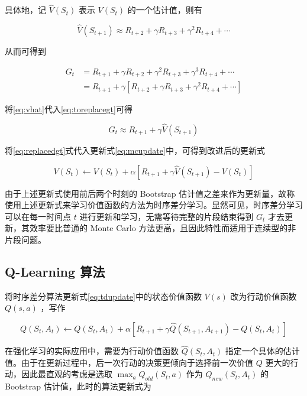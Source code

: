 具体地，记 $\widehat{V}(S_{t})$ 表示 $V({S_t})$ 的一个估计值，则有

\begin{equation}\label{eq:vhat}
    \widehat{V}(S_{t+1}) \approx R_{t+2} + \gamma R_{t+3} + \gamma^2 R_{t+4} + \cdots
\end{equation}

从而可得到

\begin{equation}\label{eq:toreplacegt}
    \begin{aligned}
        G_t &= R_{t+1}+\gamma R_{t+2}+\gamma^2 R_{t+3}+\gamma^3 R_{t+4}+\cdots\\
        &=R_{t+1}+\gamma\left[R_{t+2}+\gamma R_{t+3}+\gamma^2 R_{t+4}+\cdots\right]
    \end{aligned}
\end{equation}

将\ref{eq:vhat}代入\ref{eq:toreplacegt}可得

\begin{equation}\label{eq:replacedgt}
    G_t \approx R_{t+1} +\gamma \widehat{V}(S_{t+1})
\end{equation}

将\ref{eq:replacedgt}式代入更新式\ref{eq:mcupdate}中，可得到改进后的更新式

\begin{equation}\label{eq:tdupdate}
    V(S_t)\leftarrow V(S_t)+\alpha\left[R_{t+1}+\gamma \widehat{V}(S_{t+1})-V(S_t)\right]
\end{equation}

由于上述更新式使用前后两个时刻的 Bootstrap 估计值之差来作为更新量，故称使用上述更新式来学习价值函数的方法为{\jiacu 时序差分学习}。显然可见，时序差分学习可以在每一时间点 $t$ 进行更新和学习，无需等待完整的片段结束得到 $G_t$ 才去更新，其效率要比普通的 Monte Carlo 方法更高，且因此特性而适用于连续型的非片段问题。

\subsection{Q-Learning 算法}

将时序差分算法更新式\ref{eq:tdupdate}中的状态价值函数 $V(s)$ 改为行动价值函数 $Q(s,a)$ ，写作

\begin{equation}
    Q(S_t,A_t)\leftarrow Q(S_t,A_t)+\alpha\left[R_{t+1}+\gamma \widehat{Q}(S_{t+1},A_{t+1})-Q(S_t,A_t)\right]
\end{equation}

在强化学习的实际应用中，需要为行动价值函数 $\widehat{Q}(S_t,A_t)$ 指定一个具体的估计值。由于在更新过程中，后一次行动的决策更倾向于选择前一次价值 $Q$ 更大的行动，因此最直观的考虑是选取 $\max_a Q_{old}(S_t,a)$ 作为 $Q_{new}(S_t,A_t)$ 的 Bootstrap 估计值，此时的算法更新式为

